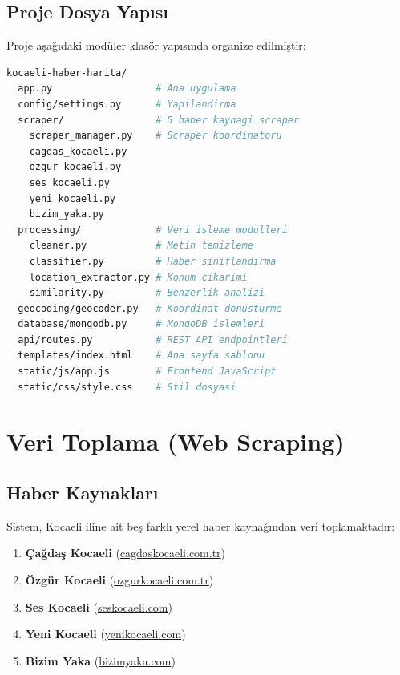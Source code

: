 \documentclass[conference]{IEEEtran}
\begin{document}
\subsection{Proje Dosya Yapısı}

Proje aşağıdaki modüler klasör yapısında organize edilmiştir:

\begin{lstlisting}[language=bash, caption=Proje dosya yapısı]
kocaeli-haber-harita/
  app.py                  # Ana uygulama
  config/settings.py      # Yapilandirma
  scraper/                # 5 haber kaynagi scraper
    scraper_manager.py    # Scraper koordinatoru
    cagdas_kocaeli.py
    ozgur_kocaeli.py
    ses_kocaeli.py
    yeni_kocaeli.py
    bizim_yaka.py
  processing/             # Veri isleme modulleri
    cleaner.py            # Metin temizleme
    classifier.py         # Haber siniflandirma
    location_extractor.py # Konum cikarimi
    similarity.py         # Benzerlik analizi
  geocoding/geocoder.py   # Koordinat donusturme
  database/mongodb.py     # MongoDB islemleri
  api/routes.py           # REST API endpointleri
  templates/index.html    # Ana sayfa sablonu
  static/js/app.js        # Frontend JavaScript
  static/css/style.css    # Stil dosyasi
\end{lstlisting}

\section{Veri Toplama (Web Scraping)}

\subsection{Haber Kaynakları}

Sistem, Kocaeli iline ait beş farklı yerel haber kaynağından veri toplamaktadır:

\begin{enumerate}
    \item \textbf{Çağdaş Kocaeli} (\url{cagdaskocaeli.com.tr})
    \item \textbf{Özgür Kocaeli} (\url{ozgurkocaeli.com.tr})
    \item \textbf{Ses Kocaeli} (\url{seskocaeli.com})
    \item \textbf{Yeni Kocaeli} (\url{yenikocaeli.com})
    \item \textbf{Bizim Yaka} (\url{bizimyaka.com})
\end{enumerate}
\end{document}

